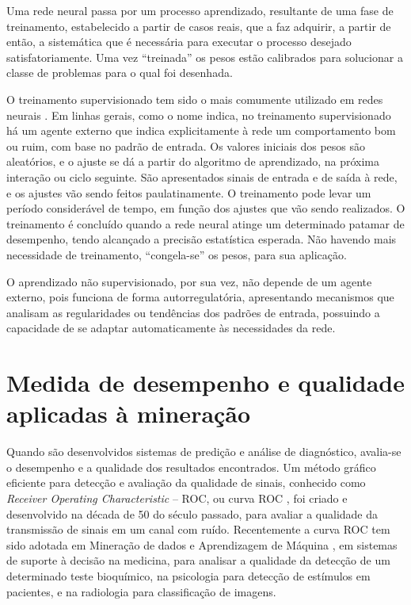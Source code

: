 Uma rede neural passa por um processo aprendizado, resultante de uma fase de treinamento, estabelecido a partir de casos reais, que a faz adquirir, a partir de então, a sistemática que é necessária para executar o processo desejado satisfatoriamente. 
Uma vez ``treinada'' os pesos estão calibrados para solucionar a classe de problemas para o qual foi desenhada. 


O treinamento supervisionado tem sido o mais comumente utilizado em redes neurais \cite{Barreto2002}. 
Em linhas gerais, como o nome indica, no treinamento supervisionado há um agente externo que indica explicitamente à rede um 
comportamento bom ou ruim, com base no padrão de entrada. Os valores iniciais dos pesos são aleatórios, e o ajuste se dá a partir do 
algoritmo de aprendizado, na próxima interação ou ciclo seguinte. São apresentados sinais de entrada e de saída à rede, e os ajustes 
vão sendo feitos paulatinamente. O treinamento pode levar um período considerável de tempo, em função dos ajustes que vão sendo 
realizados. O treinamento é concluído quando a rede neural atinge um determinado patamar de desempenho, tendo alcançado a precisão 
estatística esperada. 
Não havendo mais necessidade de treinamento, “congela-se” os pesos, para sua aplicação. 

O aprendizado não supervisionado, por sua vez, não depende de um agente externo, pois funciona de forma autorregulatória, apresentando 
mecanismos que analisam as regularidades ou tendências dos padrões de entrada, possuindo a capacidade de se adaptar automaticamente às 
necessidades da rede. 


\section{Medida de desempenho e qualidade aplicadas à mineração}

Quando são desenvolvidos sistemas de predição e análise de diagnóstico, avalia-se o desempenho e a qualidade dos resultados encontrados.
Um método gráfico eficiente para detecção e avaliação da qualidade de sinais, conhecido como \textit{Receiver Operating Characteristic} -- ROC, ou curva ROC \cite{ROC},
foi criado e desenvolvido na década de 50 do século passado, para avaliar a qualidade da transmissão de sinais em um canal com ruído.
Recentemente a curva ROC tem sido adotada em Mineração de dados e Aprendizagem de Máquina \cite{MD_AM}, em sistemas de suporte à decisão na medicina, para analisar a qualidade da detecção 
de um determinado teste bioquímico, na psicologia para detecção de estímulos \cite{Discriminativo} em pacientes, e na radiologia para classificação de imagens.

